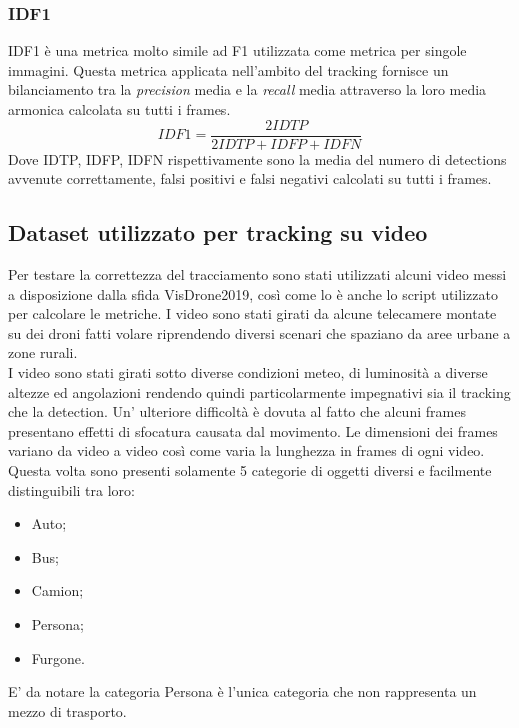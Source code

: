 \subsubsection{IDF1}
IDF1\cite{IDF1} è una metrica molto simile ad F1 utilizzata come metrica per singole immagini. Questa metrica applicata nell'ambito del tracking fornisce un bilanciamento tra la \textit{precision} media e la \textit{recall} media attraverso la loro media armonica calcolata su tutti i frames. 
\[
IDF1 = \frac{2IDTP}{2IDTP+IDFP+IDFN}
\]
Dove IDTP, IDFP, IDFN rispettivamente sono la media del numero di detections avvenute correttamente, falsi positivi e falsi negativi calcolati su tutti i frames. 

\subsection{Dataset utilizzato per tracking su video}
Per testare la correttezza del tracciamento sono stati utilizzati alcuni video messi a disposizione dalla sfida VisDrone2019, così come lo è anche lo script utilizzato per calcolare le metriche. I video sono stati girati da alcune telecamere montate su dei droni fatti volare riprendendo diversi scenari che spaziano da aree urbane a zone rurali.\\
I video sono stati girati sotto diverse condizioni meteo, di luminosità a diverse altezze ed angolazioni rendendo quindi particolarmente impegnativi sia il tracking che la detection. Un' ulteriore difficoltà è dovuta al fatto che alcuni frames presentano effetti di sfocatura causata dal movimento. Le dimensioni dei frames variano da video a video così come varia la lunghezza in frames di ogni video. Questa volta sono presenti solamente 5 categorie di oggetti diversi e facilmente distinguibili tra loro:
\begin{itemize}
\item Auto;
\item Bus;
\item Camion;
\item Persona;
\item Furgone.
\end{itemize}
E' da notare la categoria Persona è l'unica categoria che non rappresenta un mezzo di trasporto.

